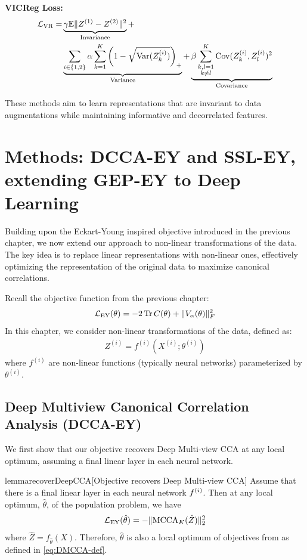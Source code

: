 \textbf{VICReg Loss:}
\begin{equation}
\begin{split}
\mathcal{L}_\text{VR} = &\underbrace{\gamma \mathbb{E} \lVert Z^{(1)} - Z^{(2)}\rVert^2}_{\text{Invariance}} + \\
&\underbrace{\sum_{i \in \{1,2\}} \alpha \sum_{k=1}^K \left(1 - \sqrt{\mathrm{Var}(Z^{(i)}_k)}\right)_+}_{\text{Variance}} + 
\underbrace{\beta \sum_{\substack{k,l=1 \\ k \neq l}}^K \mathrm{Cov}(Z^{(i)}_k, Z^{(i)}_l)^2}_{\text{Covariance}}
\end{split}
\end{equation}

These methods aim to learn representations that are invariant to data augmentations while maintaining informative and decorrelated features.

\section{Methods: DCCA-EY and SSL-EY, extending GEP-EY to Deep Learning}

Building upon the Eckart-Young inspired objective introduced in the previous chapter, we now extend our approach to non-linear transformations of the data. The key idea is to replace linear representations with non-linear ones, effectively optimizing the representation of the original data to maximize canonical correlations.

Recall the objective function from the previous chapter:
\begin{align}
\mathcal{L}_\text{EY}(\theta) = -2 \operatorname{Tr} C(\theta) + \lVert V_\alpha(\theta)\rVert_F^2
\end{align}
In this chapter, we consider non-linear transformations of the data, defined as:
\begin{align}
Z^{(i)} = f^{(i)}(X^{(i)}; \theta^{(i)})
\end{align}
where $f^{(i)}$ are non-linear functions (typically neural networks) parameterized by $\theta^{(i)}$.

\subsection{Deep Multiview Canonical Correlation Analysis (DCCA-EY)}

We first show that our objective recovers Deep Multi-view CCA at any local optimum, assuming a final linear layer in each neural network.

\begin{restatable}{lemma}{recoverDeepCCA}[Objective recovers Deep Multi-view CCA]\label{lem:recover-DeepCCA}
    Assume that there is a final linear layer in each neural network $f^{(i)}$.
    Then at any local optimum, $\hat{\theta}$, of the population problem, we have
    \begin{align*}
        \mathcal{L}_\text{EY}(\hat{\theta}) = - \lVert\operatorname{MCCA}_K(\hat{Z})\rVert_2^2
    \end{align*}
    where $\hat{Z} = f_{\hat{\theta}}(X)$.
    Therefore, $\hat{\theta}$ is also a local optimum of objectives from \citet{andrew2013deep, somandepalli2019multimodal} as defined in \cref{eq:DMCCA-def}.
\end{restatable}


